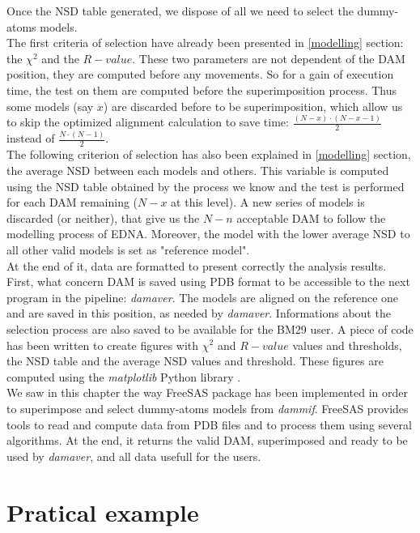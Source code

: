 \documentclass[a4paper, 11pt]{report}
\begin{document}
Once the NSD table generated, we dispose of all we need to select the 
dummy-atoms models.\\
The first criteria of selection have already been presented in 
\ref{modelling} section: the $\chi^2$ and the $R-value$. 
These two parameters are not dependent of the DAM position, they are 
computed before any movements. 
So for a gain of execution time, the test on them are computed before 
the superimposition process. 
Thus some models (say $x$) are discarded before to be superimposition, 
which allow us to skip the optimized alignment calculation to save 
time: $\frac{(N-x) \cdot (N-x-1)}{2}$ instead of 
$\frac{N \cdot (N-1)}{2}$.\\
The following criterion of selection has also been explained in 
\ref{modelling} section, the average NSD between each models and 
others. 
This variable is computed using the NSD table obtained by the process 
we know and the test is performed for each DAM remaining ($N-x$ at 
this level). 
A new series of models is discarded (or neither), that give us the 
$N-n$ acceptable DAM to follow the modelling process of EDNA. 
Moreover, the model with the lower average NSD to all other valid 
models is set as "reference model".\\

At the end of it, data are formatted to present correctly the analysis 
results. 
First, what concern DAM is saved using PDB format to be accessible to 
the next program in the pipeline: \textit{damaver}. 
The models are aligned on the reference one and are saved in this 
position, as needed by \textit{damaver}. 
Informations about the selection process are also saved to be 
available for the BM29 user. 
A piece of code has been written to create figures with $\chi^2$ and 
$R-value$ values and thresholds, the NSD table and the average NSD 
values and threshold. 
These figures are computed using the \textit{matplotlib} Python 
library \cite{matplotlib}.\\

We saw in this chapter the way FreeSAS package has been implemented in 
order to superimpose and select dummy-atoms models from 
\textit{dammif}. 
FreeSAS provides tools to read and compute data from PDB files and to 
process them using several algorithms. 
At the end, it returns the valid DAM, superimposed and ready to be 
used by \textit{damaver}, and all data usefull for the users.


\chapter{Pratical example}%
\end{document}
